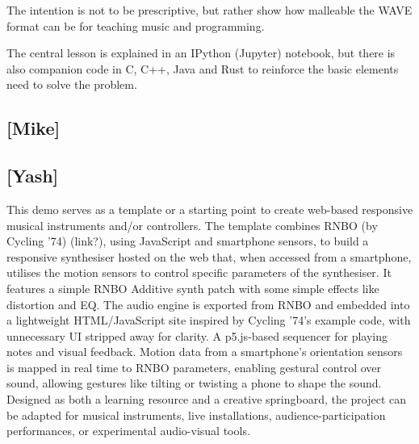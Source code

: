 The intention is not to be prescriptive, but rather show how malleable the WAVE format can be for teaching music and programming.


The central lesson is explained in an IPython (Jupyter) notebook, but there is also companion code in C, C++, Java and Rust to reinforce the basic elements need to solve the problem.


\subsection{[Mike]}

\subsection{[Yash]}
This demo serves as a template or a starting point to create web-based responsive musical instruments and/or controllers. The template combines RNBO (by Cycling '74) (link?), using JavaScript and smartphone sensors, to build a responsive synthesiser hosted on the web that, when accessed from a smartphone, utilises the motion sensors to control specific parameters of the synthesiser. It features a simple RNBO Additive synth patch with some simple effects like distortion and EQ. The audio engine is exported from RNBO and embedded into a lightweight HTML/JavaScript site inspired by Cycling ’74’s example code, with unnecessary UI stripped away for clarity. A p5.js-based sequencer for playing notes and visual feedback. Motion data from a smartphone’s orientation sensors is mapped in real time to RNBO parameters, enabling gestural control over sound, allowing gestures like tilting or twisting a phone to shape the sound. Designed as both a learning resource and a creative springboard, the project can be adapted for musical instruments, live installations, audience-participation performances, or experimental audio-visual tools.


